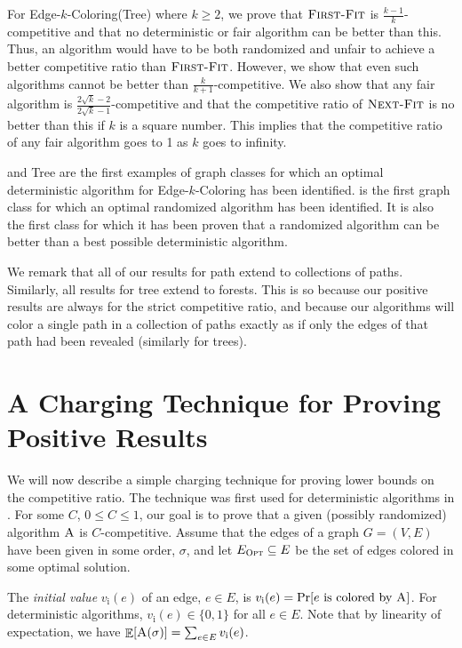 \documentclass[smallextended]{svjour3}
\def\mck{{\sc Edge-$k$-Coloring}\xspace}
\def\mctree{{\sc Edge-$k$-Coloring(Tree)}\xspace}
\def\paths{\text{\sc Path}\xspace}
\newcommand{\ivalue}{\ensuremath{v_{\text{i}}}\xspace}
\newcommand{\NF}{\ensuremath{\operatorname{\textsc{Next-Fit}}}\xspace}
\newcommand{\FF}{\ensuremath{\operatorname{\textsc{First-Fit}}}\xspace}
\newcommand{\OPT}{\ensuremath{\operatorname{\textsc{Opt}}}\xspace}
\newcommand{\ALG}{\ensuremath{\operatorname{\textsc{A}}}\xspace}
\DeclareMathOperator{\E}{\mathbb{E}}
\begin{document}
For \mctree where $k\geq 2$, we prove that \FF is
$\frac{k-1}{k}$-competitive and that no deterministic or fair
algorithm can be better than this.
Thus, an algorithm would have to be both randomized and unfair to
achieve a better competitive ratio than \FF.
However, we show that even such algorithms cannot be better than
$\frac{k}{k+1}$-competitive. 
We also show that
any fair algorithm is $\frac{2\sqrt{k}-2}{2\sqrt{k}-1}$-competitive
and that the competitive ratio of \NF is no better than this if $k$ is
a square number.
This implies that the competitive ratio of any fair algorithm goes to
 1 as $k$ goes to infinity.

\paths and {\sc Tree} are the first examples of graph classes
for which 
 an optimal deterministic algorithm for \mck has been identified.
\paths is the first graph class for which an optimal randomized
 algorithm has been identified.
It is also the first class for which it has been proven that a
 randomized algorithm can be better than a best possible deterministic
 algorithm.

We remark that all of our results for {\sc path} extend to collections of paths. Similarly, all results for {\sc tree} extend to forests. This is so because our positive results are always for the strict competitive ratio, and because our algorithms will color a single path in a collection of paths exactly as if only the edges of that path had been revealed (similarly for trees).


\section{A Charging Technique for Proving Positive Results}
\label{lowertech}
We will now describe a simple charging technique for proving lower bounds on the competitive ratio. The technique was first used for deterministic algorithms in \cite{kedge}. 
For some $C$, $0 \leq C \leq 1$, our goal is to prove that a given
 (possibly randomized) algorithm $\ALG$ is $C$-competitive. 
Assume that the edges of a graph $G=(V,E)$ have been given in some
 order, $\sigma$, and let $E_{\OPT} \subseteq E$ be the set of edges colored in some optimal
 solution. 

The \emph{initial value} $\ivalue(e)$ of an edge, $e\in E$, is
 $\ivalue(e)=\Pr [\text{$e$ is colored by $\ALG$}]$. 
For deterministic algorithms, $\ivalue(e) \in \{0,1\}$ for all $e \in E$.
Note that by
 linearity of expectation, we have $\E[\ALG(\sigma)]=\sum_{e\in
  E}\ivalue(e)$. 
\end{document}
